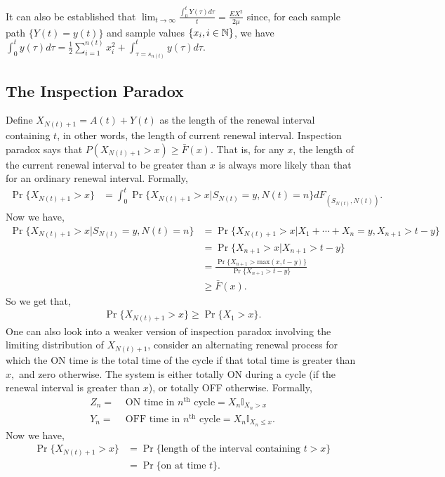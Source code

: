 \documentclass[a4paper,10pt,english]{article}
\begin{document}
It can also be established that $\lim_{t\to \infty}\frac{\int_0^t Y(\tau) d\tau}{t} = \frac{EX^2}{2\mu}$ since, for each sample path $\{Y(t)= y(t)\}$ and sample values $\{x_i,i\in\mathbb{N}\}$, we have $\int_0^ty(\tau)d\tau = \frac{1}{2}\sum_{i=1}^{n(t)}x_i^2+\int_{\tau=s_{n(t)}}^t y(\tau)d\tau$.




\subsection{The Inspection Paradox}
Define $X_{N(t)+1}=A(t)+Y(t)$ as the length of the renewal interval containing $t$, in other words, the length of current renewal interval. Inspection paradox says that $P(X_{N(t)+1} >x)\geq \bar{F}(x)$. That is, for any $x$, the length of the current renewal interval to be greater than $x$ is always more likely than that for an ordinary renewal interval. Formally,
\begin{align*}
\Pr\{X_{N(t)+1}>x\}&= \int_{0}^t\Pr\{X_{N(t)+1} > x | S_{N(t)} = y, N(t)=n\}dF_{(S_{N(t)}, N(t))}.
\end{align*}
Now we have,
\begin{align*}
\Pr\{X_{N(t)+1}>x | S_{N(t)}=y, N(t)=n\} & = \Pr\{X_{N(t)+1}>x | X_1+\cdots+X_n=y, X_{n+1}>t-y\} \\
& = \Pr\{X_{n+1}>x | X_{n+1}>t-y\} \\
& = \frac{\Pr\{X_{n+1}>\text{max}(x,t-y)\}}{\Pr\{X_{n+1}>t-y\}} \\
& \geq \bar{F}(x). 
\end{align*}
So we get that,
\begin{align*}
\Pr\{X_{N(t)+1}>x\}\geq \Pr\{X_{1}>x\}.
\end{align*}
One can also look into a weaker version of inspection paradox involving
the limiting distribution of $X_{N(t)+1}$, consider an alternating 
renewal process for which the ON time is the total time of the cycle if that 
total time is greater than $x,$ and zero otherwise. The system is either totally ON 
during a cycle (if the renewal interval is greater than $x$), or totally OFF 
otherwise. Formally,
\begin{align*}
Z_n= &\text{ ON time in $n^{\text{th}}$ cycle} = X_n \mathbb{I}_{X_n>x} \\
Y_n= &\text{ OFF time in $n^{\text{th}}$ cycle} = X_n \mathbb{I}_{X_n\leq x}.
\end{align*}
Now we have,
\begin{align*}
\Pr \{X_{N(t)+1}>x\} &= \Pr\{\text{length of the interval containing } t>x\}\\
&= \Pr\{ \text{on at time } t \}.
\end{align*}
\end{document}

